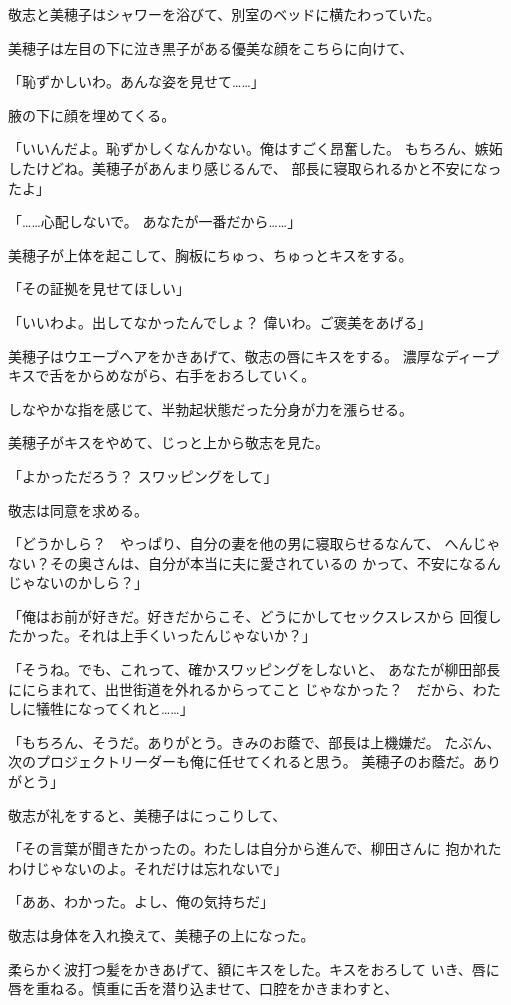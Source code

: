 ﻿\documentclass[
    book,tate,
    line_length=30zw,
    jafontsize=12pt,
    paper=b5j,
    landscape,
    ]{jlreq}
\begin{document}
敬志と美穂子はシャワーを浴びて、別室のベッドに横たわっていた。

美穂子は左目の下に泣き黒子がある優美な顔をこちらに向けて、

「恥ずかしいわ。あんな姿を見せて……」

腋の下に顔を埋めてくる。

「いいんだよ。恥ずかしくなんかない。俺はすごく昂奮した。
もちろん、嫉妬したけどね。美穂子があんまり感じるんで、
部長に寝取られるかと不安になったよ」

「……心配しないで。 あなたが一番だから……」

美穂子が上体を起こして、胸板にちゅっ、ちゅっとキスをする。

「その証拠を見せてほしい」

「いいわよ。出してなかったんでしょ？ 偉いわ。ご褒美をあげる」

美穂子はウエーブヘアをかきあげて、敬志の唇にキスをする。
濃厚なディープキスで舌をからめながら、右手をおろしていく。

しなやかな指を感じて、半勃起状態だった分身が力を漲らせる。

美穂子がキスをやめて、じっと上から敬志を見た。

「よかっただろう？ スワッピングをして」

敬志は同意を求める。

「どうかしら？　やっぱり、自分の妻を他の男に寝取らせるなんて、
へんじゃない？その奥さんは、自分が本当に夫に愛されているの
かって、不安になるんじゃないのかしら？」

「俺はお前が好きだ。好きだからこそ、どうにかしてセックスレスから
回復したかった。それは上手くいったんじゃないか？」

「そうね。でも、これって、確かスワッピングをしないと、
あなたが柳田部長ににらまれて、出世街道を外れるからってこと
じゃなかった？　だから、わたしに犠牲になってくれと……」

「もちろん、そうだ。ありがとう。きみのお蔭で、部長は上機嫌だ。
たぶん、次のプロジェクトリーダーも俺に任せてくれると思う。
美穂子のお蔭だ。ありがとう」

敬志が礼をすると、美穂子はにっこりして、

「その言葉が聞きたかったの。わたしは自分から進んで、柳田さんに
抱かれたわけじゃないのよ。それだけは忘れないで」

「ああ、わかった。よし、俺の気持ちだ」

敬志は身体を入れ換えて、美穂子の上になった。

柔らかく波打つ髪をかきあげて、額にキスをした。キスをおろして
いき、唇に唇を重ねる。慎重に舌を潜り込ませて、口腔をかきまわすと、
\end{document}
